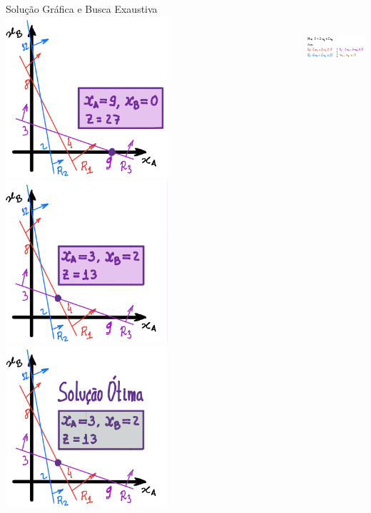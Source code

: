 \documentclass{beamer}
\begin{document}
\begin{frame}
\begin{columns}
\begin{column}{0.6\textwidth}
\begin{block}{Solução Gráfica e Busca Exaustiva}
{				}
				\only<9>
				{
					\includegraphics[width=6cm,height=6cm]{Nutri_9.png}
				}
				\only<10>
				{
					\includegraphics[width=6cm,height=6cm]{Nutri_10.png}
				}
				\only<11>
				{
					\includegraphics[width=6cm,height=6cm]{Nutri_11.png}
				}			
			\end{block}
		\end{column}
		\begin{column}{0.4\textwidth}
			\only<1-10>
			{
				\centering
				\includegraphics[width=5cm,height=3.3cm]{Nutri_0.png}
			}
		

\end{column}
\end{columns}
\end{frame}
\end{document}
